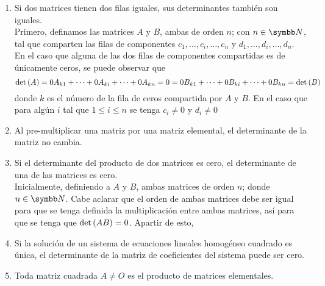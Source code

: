 \begin{enumerate}[label=\listAlph]
        \item Si dos matrices tienen dos filas iguales, sus determinantes también son iguales. \\
            Primero, definamos las matrices \(A\) y \(B\), ambas de orden \(n\); con \(n \in \realN\),
            tal que comparten las filas de componentes \(c_1, \ldots, c_i, \ldots, c_n\) y \(d_1, \ldots, d_i, \ldots, d_n\). 
            En el caso que alguna de las dos filas de componentes compartidas es de únicamente ceros, se puede observar que
            \[
                \text{det} \left( A \right) = 0A_{k1} + \cdots + 0A_{ki} + \cdots + 0A_{kn} = 0 = 0B_{k1} + \cdots + 0B_{ki} + \cdots + 0B_{kn} = \text{det} \left( B \right)
            \]
            donde \(k\) es el número de la fila de ceros compartida por \(A\) y \(B\).
            En el caso que para algún \(i\) tal que \(1 \leq i \leq n\) se tenga \(c_i \neq 0\) y \(d_i \neq 0\)
        \item Al pre-multiplicar una matriz por una matriz elemental, el determinante de la matriz no cambia.
        \item Si el determinante del producto de dos matrices es cero, el determinante de una de las matrices es cero. \\
            Inicialmente, definiendo a \(A\) y \(B\), ambas matrices de orden \(n\); donde \(n \in \realN\).
            Cabe aclarar que el orden de ambas matrices debe ser igual para que se tenga definida 
            la multiplicación entre ambas matrices, así para que se tenga que \(\text{det} \left( AB \right) = 0\).
            Apartir de esto, 
        \item Si la solución de un sistema de ecuaciones lineales homogéneo cuadrado es única, el determinante de la matriz de coeficientes del sistema puede ser cero.
        \item Toda matriz cuadrada \(A \neq O\) es el producto de matrices elementales.
    \end{enumerate}
